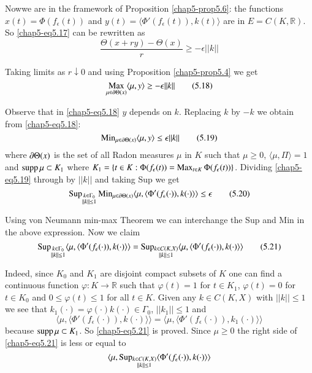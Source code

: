 Now\pageoriginale we are in the framework of Proposition
\ref{chap5-prop5.6}: the functions $x(t)=\Phi(f_{\epsilon}(t))$ and
$y(t)=\langle \Phi'(f_{\epsilon}(t)),k(t)\rangle$ are in
$E=C(K,\mathbb{R})$. So \eqref{chap5-eq5.17} can be rewritten as
$$
\frac{\Theta(x+ry)-\Theta(x)}{r}\geq -\epsilon||k||
$$

Taking limits as $r\downarrow 0$ and using Proposition
\ref{chap5-prop5.4} we get
\begin{equation*}
{\displaystyle{\mathop{\operatorname{Max}}_{\mu\in \partial\Theta(x)}}}\langle \mu,y\rangle \geq
-\epsilon||k||\tag{5.18}\label{chap5-eq5.18} 
\end{equation*}

Observe that in \eqref{chap5-eq5.18} $y$ depends on $k$. Replacing $k$
by $-k$ we obtain from \eqref{chap5-eq5.18}:
\begin{equation*}
\operatorname{Min}_{\mu\in \partial \Theta(x)}\langle \mu,y\rangle \leq \epsilon
||k||\tag{5.19}\label{chap5-eq5.19} 
\end{equation*}
where $\partial\Theta(x)$ is the set of all Radon measures $\mu$ in $K$ such
that $\mu\geq 0$, $\langle \mu, \Pi\rangle=1$ and $\operatorname{supp} \mu\subset
K_{1}$ where $K_{1}=\{t\in K:\Phi(f_{\epsilon}(t))=\operatorname{Max}_{t\in
  K}\Phi(f_{\epsilon}(t))\}$. Dividing \eqref{chap5-eq5.19} through by
$||k||$ and taking Sup we get
\begin{equation*}
\operatorname{Sup}_{\substack{k\in \Gamma_{0}\\ ||k||\leq 1}} \operatorname{Min}_{\mu\in \partial
  \Theta(x)}\langle \mu,\langle
\Phi'(f_{\epsilon}(\cdot)),k(\cdot)\rangle\rangle \leq
\epsilon\tag{5.20}\label{chap5-eq5.20} 
\end{equation*}

Using von Neumann min-max Theorem \cite{key7} we can interchange the
Sup and Min in the above expression. Now we claim
\begin{equation*}
\operatorname{Sup}_{\substack{k\in\Gamma_{0}\\ ||k||\leq 1}}\langle \mu,\langle
\Phi'(f_{\epsilon}(\cdot)),k(\cdot)\rangle \rangle
=\operatorname{Sup}_{\substack{k\in C(K,X)\\ ||k||\leq 1}}\langle \mu,\langle
\Phi'(f_{\epsilon}(\cdot)),k(\cdot)\rangle\rangle\tag{5.21}\label{chap5-eq5.21} 
\end{equation*}

Indeed, since $K_{0}$ and $K_{1}$ are disjoint compact subsets of $K$
one can find a continuous function $\varphi:K\to \mathbb{R}$ such that
$\varphi(t)=1$ for $t\in K_{1}$, $\varphi(t)=0$ for $t\in K_{0}$ and
$0\leq \varphi(t)\leq 1$ for all $t\in K$. Given any $k\in C(K,X)$
with $||k||\leq 1$ we see that $k_{1}(\cdot)=\varphi(\cdot)k(\cdot)\in
\Gamma_{0}$, $||k_{1}||\leq 1$ and
$$
\langle \mu, \langle
\Phi'(f_{\epsilon}(\cdot)),k(\cdot)\rangle\rangle=\langle
\mu,\langle\Phi'(f_{\epsilon}(\cdot)),k_{1}(\cdot)\rangle\rangle 
$$
because $\operatorname{supp} \mu\subset K_{1}$. So \eqref{chap5-eq5.21} is
proved. Since $\mu\geq 0$ the right side of \eqref{chap5-eq5.21} is
less or equal to
$$
\langle\mu,\operatorname{Sup}_{\substack{k\in C(K,X)\\||k||\leq 1}}\langle
\Phi'(f_{\epsilon}(\cdot)),k(\cdot)\rangle\rangle 
$$

